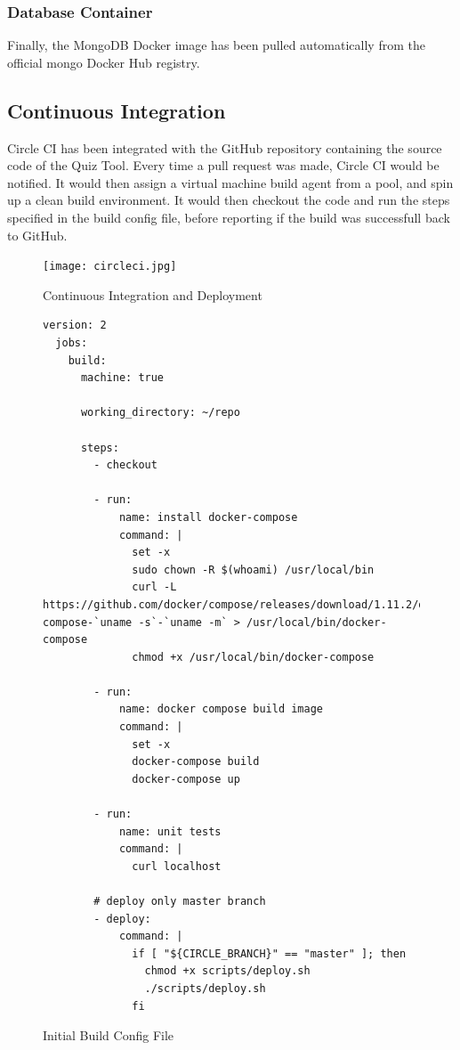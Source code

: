 \subsubsection{Database Container}
Finally, the MongoDB Docker image has been pulled automatically from the official mongo
Docker Hub registry\cite{36}.

\subsection{Continuous Integration}
Circle CI has been integrated with the GitHub repository containing the source code of the
Quiz Tool. Every time a pull request was made, Circle CI would be notified. It would then
assign a virtual machine build agent from a pool, and spin up a clean build environment.
It would then checkout the code and run the steps specified in the build config file, before
reporting if the build was successfull back to GitHub.

\begin{figure}[ht]
    \centering
    \texttt{[image: circleci.jpg]}
    \caption{Continuous Integration and Deployment}
    \label{fig:ci}
\end{figure}

\begin{figure}[h!]
  \begin{lstlisting}[basicstyle=\tiny, breaklines=true]
  version: 2
  jobs:
    build:
      machine: true

      working_directory: ~/repo

      steps:
        - checkout

        - run:
            name: install docker-compose
            command: |
              set -x
              sudo chown -R $(whoami) /usr/local/bin
              curl -L https://github.com/docker/compose/releases/download/1.11.2/docker-compose-`uname -s`-`uname -m` > /usr/local/bin/docker-compose
              chmod +x /usr/local/bin/docker-compose

        - run:
            name: docker compose build image
            command: |
              set -x
              docker-compose build
              docker-compose up

        - run:
            name: unit tests
            command: |
              curl localhost

        # deploy only master branch
        - deploy:
            command: |
              if [ "${CIRCLE_BRANCH}" == "master" ]; then
                chmod +x scripts/deploy.sh
                ./scripts/deploy.sh
              fi
  \end{lstlisting}
  \caption{Initial Build Config File}
\end{figure}

